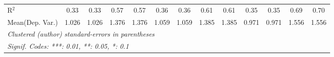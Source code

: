 \begin{tabular}{lcccccccccccc}
   R$^2$                                    & 0.33          & 0.33          & 0.57          & 0.57    & 0.36          & 0.36           & 0.61          & 0.61    & 0.35          & 0.35           & 0.69    & 0.70\\  
Mean(Dep. Var.) & 1.026 & 1.026 & 1.376 & 1.376 & 1.059 & 1.059 & 1.385 & 1.385 & 0.971 & 0.971 & 1.556 & 1.556 \\
   \midrule \midrule
   \multicolumn{13}{l}{\emph{Clustered (author) standard-errors in parentheses}}\\
   \multicolumn{13}{l}{\emph{Signif. Codes: ***: 0.01, **: 0.05, *: 0.1}}\\
\end{tabular}
\par\endgroup
